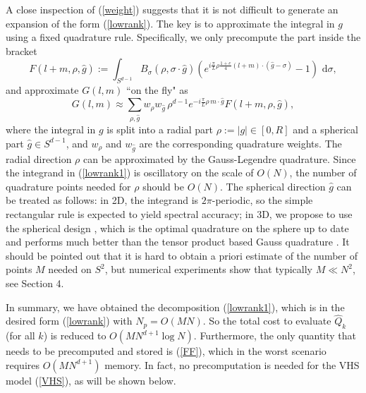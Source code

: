 \documentclass[review, times]{elsarticle}
\newcommand{\rd}{\,\mathrm{d}}
\begin{document}
A close inspection of (\ref{weight}) suggests that it is not difficult to generate an expansion of the form (\ref{lowrank}). The key is to approximate the integral in $g$ using a fixed quadrature rule. Specifically, we only precompute the part inside the bracket
\begin{equation} \label{FF}
F(l+m,\rho,\hat{g}):=\int_{S^{d-1}}B_{\sigma}(\rho,\sigma\cdot \hat{g})\left(e^{i\frac{\pi}{L}\rho \frac{1+e}{4}(l+m)\cdot (\hat{g}-\sigma)}-1\right)\,\rd{\sigma},
\end{equation}
and approximate $G(l,m)$ ``on the fly" as
\begin{equation} \label{lowrank1}
G(l,m)\approx \sum_{\rho, \hat{g}}w_{\rho}w_{\hat{g}}\, \rho^{d-1} e^{-i\frac{\pi}{L}\rho\, m \cdot \hat{g}} F(l+m,\rho,\hat{g}),
\end{equation}
where the integral in $g$ is split into a radial part $\rho:=|g|\in [0,R]$ and a spherical part $\hat{g}\in S^{d-1}$, and $w_{\rho}$ and $w_{\hat{g}}$ are the corresponding quadrature weights. The radial direction $\rho$ can be approximated by the Gauss-Legendre quadrature. Since the integrand in (\ref{lowrank1}) is oscillatory on the scale of $O(N)$, the number of quadrature points needed for $\rho$ should be $O(N)$. The spherical direction $\hat{g}$ can be treated as follows: in 2D, the integrand is $2\pi$-periodic, so the simple rectangular rule is expected to yield spectral accuracy; in 3D, we propose to use the spherical design \cite{Womersley}, which is the optimal quadrature on the sphere up to date and performs much better than the tensor product based Gauss quadrature \cite{Beentjes15}. It should be pointed out that it is hard to obtain a priori estimate of the number of points $M$ needed on $S^2$, but numerical experiments show that typically $M\ll N^2$, see Section 4.

In summary, we have obtained the decomposition (\ref{lowrank1}), which is in the desired form (\ref{lowrank}) with $N_p=O(MN)$. So the total cost to evaluate $\hat{Q}_k$ (for all $k$) is reduced to $O(MN^{d+1}\log N)$. Furthermore, the only quantity that needs to be precomputed and stored is (\ref{FF}), which in the worst scenario requires $O(MN^{d+1})$ memory. In fact, no precomputation is needed for the VHS model (\ref{VHS}), as will be shown below.
\end{document}
